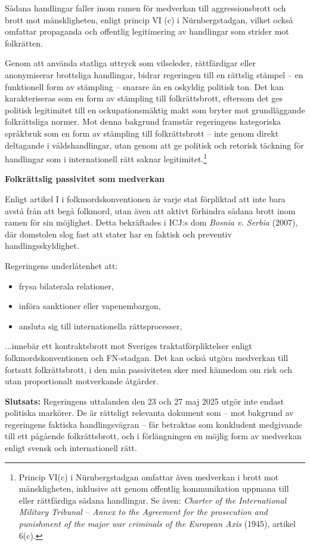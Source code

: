 Sådana handlingar faller inom ramen för medverkan till aggressionsbrott och brott mot mänskligheten, enligt princip VI (c) i Nürnbergstadgan, 
vilket också omfattar propaganda och offentlig legitimering av handlingar som strider mot folkrätten.

Genom att använda statliga uttryck som vilseleder, rättfärdigar eller anonymiserar brottsliga handlingar, bidrar regeringen till en 
rättslig stämpel – en funktionell form av stämpling – snarare än en oskyldig politisk ton. 
Det kan karakteriseras som en form av stämpling till folkrättsbrott, eftersom det ges politisk legitimitet 
till en ockupationsmäktig makt som bryter mot grundläggande folkrättsliga normer.
Mot denna bakgrund framstår regeringens kategoriska språkbruk som en form av stämpling till 
folkrättsbrott – inte genom direkt deltagande i våldshandlingar, utan genom att ge politisk och retorisk 
täckning för handlingar som i internationell rätt saknar legitimitet.\footnote{Princip VI(c) i Nürnbergstadgan omfattar även medverkan i brott mot mänskligheten, inklusive att genom offentlig kommunikation uppmana till eller rättfärdiga sådana handlingar. Se även: \textit{Charter of the International Military Tribunal – Annex to the Agreement for the prosecution and punishment of the major war criminals of the European Axis} (1945), artikel 6(c).}





\textbf{Folkrättslig passivitet som medverkan}

Enligt artikel I i folkmordskonventionen är varje stat förpliktad att inte bara avstå från att begå folkmord, utan även att aktivt förhindra sådana brott inom ramen för sin möjlighet. Detta bekräftades i ICJ:s dom \textit{Bosnia v. Serbia} (2007), där domstolen slog fast att stater har en faktisk och preventiv handlingsskyldighet.

Regeringens underlåtenhet att:

\begin{itemize}
    \item frysa bilaterala relationer,
    \item införa sanktioner eller vapenembargon,
    \item ansluta sig till internationella rättsprocesser,
\end{itemize}

...innebär ett kontraktsbrott mot Sveriges traktatförpliktelser enligt folkmordskonventionen och FN-stadgan. Det kan också utgöra medverkan till fortsatt folkrättsbrott, i den mån passiviteten sker med kännedom om risk och utan proportionalt motverkande åtgärder.

\medskip

\textbf{Slutsats:} Regeringens uttalanden den 23 och 27 maj 2025 utgör inte endast politiska markörer. De är rättsligt relevanta dokument som – mot bakgrund av regeringens faktiska handlingsvägran – får betraktas som konkludent medgivande till ett pågående folkrättsbrott, och i förlängningen en möjlig form av medverkan enligt svensk och internationell rätt.


